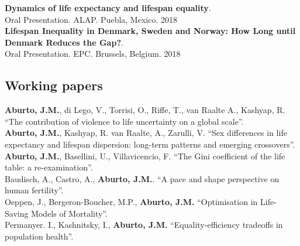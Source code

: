\documentclass[12pt]{article}
\begin{document}
\textbf{Dynamics of life expectancy and lifespan equality}.\\ Oral Presentation. ALAP. Puebla, Mexico. \hfill { 2018}\\

\textbf{Lifespan Inequality in Denmark, Sweden and Norway: How Long until Denmark Reduces the Gap?}.\\ Oral Presentation. EPC. Brussels, Belgium. \hfill { 2018}\\



\subsection*{Working papers}
 \textbf{Aburto, J.M.}, di Lego, V., Torrisi, O., Riffe, T., van Raalte A., Kashyap, R. ``The contribution of violence to life uncertainty on a global scale''.\\

 \textbf{Aburto, J.M.}, Kashyap, R. van Raalte, A., Zarulli, V. ``Sex differences in life expectancy and lifespan dispersion: long-term patterns and emerging crossovers''.\\

\textbf{Aburto, J.M.}, Basellini, U., Villavicencio, F. ``The Gini coefficient of the life table: a re-examination''. \\
 
Baudisch, A., Castro, A., \textbf{Aburto, J.M.}. ``A pace and shape perspective on human fertility''. \\


Oeppen, J., Bergeron-Boucher, M.P., \textbf{Aburto, J.M.} ``Optimisation in Life-Saving Models of Mortality''.\\ 
  
Permanyer. I., Kashnitsky, I.,  \textbf{Aburto, J.M.} ``Equality-efficiency tradeoffs in population health''. \\


\end{document}
